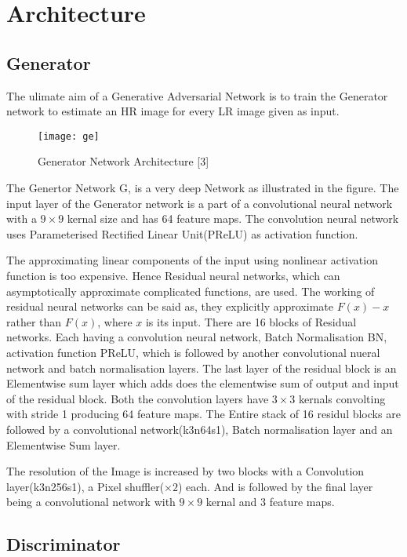 

\section{Architecture}

\subsection{Generator}

The ulimate aim of a Generative Adversarial Network is to train the Generator network to estimate an HR image for every LR image given as input.


\begin{figure}[h]
\texttt{[image: ge]}
\caption{Generator Network Architecture [3]}
\end{figure}


The Genertor Network G, is a very deep Network as illustrated in the figure. The input layer of the Generator network is a part of a convolutional neural network with a $9\times 9$ kernal size and has 64 feature maps. The convolution neural network uses Parameterised Rectified Linear Unit(PReLU) as activation function. 

The approximating linear components of the input using nonlinear activation function is too expensive. Hence Residual neural networks, which can asymptotically approximate complicated functions, are used. The working of residual neural networks can be said as, they explicitly approximate $F(x)-x$ rather than $F(x)$, where $x$ is its input. There are 16 blocks of Residual networks. Each having a convolution neural network, Batch Normalisation BN, activation function PReLU, which is followed by another convolutional nueral network and batch normalisation layers. The last layer of the residual block is an Elementwise sum layer which adds does the elementwise sum of output and input of the residual block. Both the convolution layers have $3\times 3$ kernals convolting with stride 1 producing 64 feature maps. The Entire stack of 16 residul blocks are followed by a convolutional network(k3n64s1), Batch normalisation layer and an Elementwise Sum layer. 

The resolution of the Image is increased by two blocks with a Convolution layer(k3n256s1), a Pixel shuffler($\times 2$) each. And is followed by the final layer  
being a convolutional network with $ 9\times 9 $ kernal and 3 feature maps.

\subsection{Discriminator}

